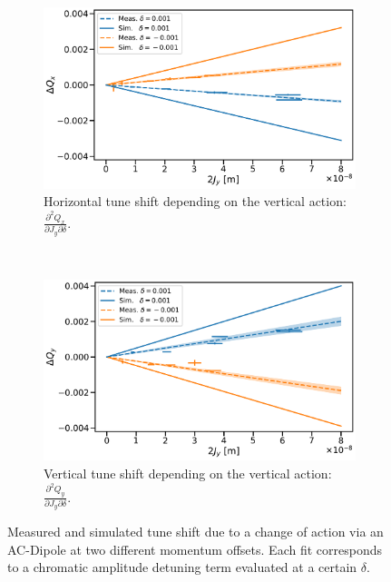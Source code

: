 \begin{figure}[H]
  \centering
  \begin{subfigure}{0.8\textwidth}
      \centering
      \includegraphics[width=\textwidth]{images/chromatic_amplitude_detuning/B2_Qxy_decay0.00.pdf}
      \caption{Horizontal tune shift depending on the vertical action: 
      $\frac{\partial^2 Q_x}{\partial J_y \partial \delta}$.}
      \label{figure:decapoles:chromatic_amplitude_detuning:b2qxy}
  \end{subfigure}
  \\[1em]
  \begin{subfigure}{0.8\textwidth}
      \centering
      \includegraphics[width=\textwidth]{images/chromatic_amplitude_detuning/B2_Qyy_decay0.00.pdf}
      \caption{Vertical tune shift depending on the vertical action: 
      $\frac{\partial^2 Q_y}{\partial J_y \partial \delta}$.}
      \label{figure:decapoles:chromatic_amplitude_detuning:b2qyy}
  \end{subfigure}
  \caption{Measured and simulated tune shift due to a change of action via an AC-Dipole at two
  different momentum offsets. Each fit corresponds to a chromatic amplitude detuning term evaluated
  at a certain $\delta$.}
  \label{figure:decapoles:chromatic_amplitude_detuning:two_terms}
\end{figure}


